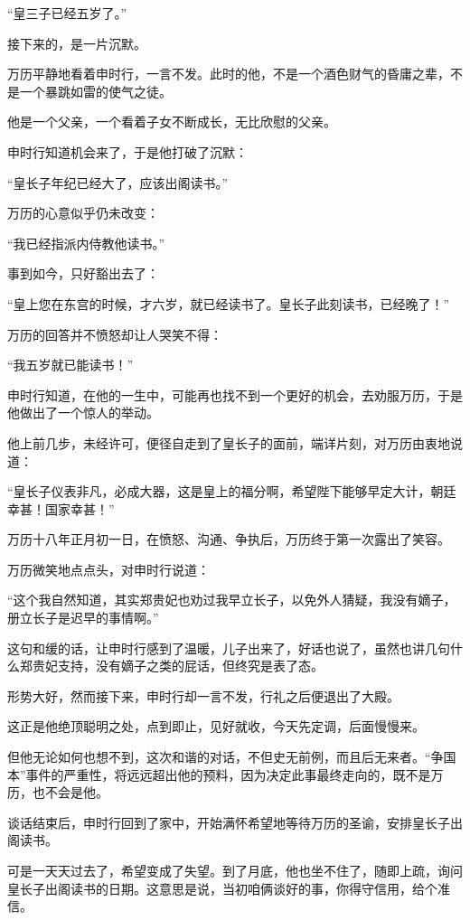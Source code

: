\begin{multicols}{\theparacolNo}
		“皇三子已经五岁了。”

		接下来的，是一片沉默。

		万历平静地看着申时行，一言不发。此时的他，不是一个酒色财气的昏庸之辈，不是一个暴跳如雷的使气之徒。

		他是一个父亲，一个看着子女不断成长，无比欣慰的父亲。

		申时行知道机会来了，于是他打破了沉默：

		“皇长子年纪已经大了，应该出阁读书。”

		万历的心意似乎仍未改变：

		“我已经指派内侍教他读书。”

		事到如今，只好豁出去了：

		“皇上您在东宫的时候，才六岁，就已经读书了。皇长子此刻读书，已经晚了！”

		万历的回答并不愤怒却让人哭笑不得：

		“我五岁就已能读书！”

		申时行知道，在他的一生中，可能再也找不到一个更好的机会，去劝服万历，于是他做出了一个惊人的举动。

		他上前几步，未经许可，便径自走到了皇长子的面前，端详片刻，对万历由衷地说道：

		“皇长子仪表非凡，必成大器，这是皇上的福分啊，希望陛下能够早定大计，朝廷幸甚！国家幸甚！”

		万历十八年正月初一日，在愤怒、沟通、争执后，万历终于第一次露出了笑容。

		万历微笑地点点头，对申时行说道：

		“这个我自然知道，其实郑贵妃也劝过我早立长子，以免外人猜疑，我没有嫡子，册立长子是迟早的事情啊。”

		这句和缓的话，让申时行感到了温暖，儿子出来了，好话也说了，虽然也讲几句什么郑贵妃支持，没有嫡子之类的屁话，但终究是表了态。

		形势大好，然而接下来，申时行却一言不发，行礼之后便退出了大殿。

		这正是他绝顶聪明之处，点到即止，见好就收，今天先定调，后面慢慢来。

		但他无论如何也想不到，这次和谐的对话，不但史无前例，而且后无来者。“争国本”事件的严重性，将远远超出他的预料，因为决定此事最终走向的，既不是万历，也不会是他。

		谈话结束后，申时行回到了家中，开始满怀希望地等待万历的圣谕，安排皇长子出阁读书。

		可是一天天过去了，希望变成了失望。到了月底，他也坐不住了，随即上疏，询问皇长子出阁读书的日期。这意思是说，当初咱俩谈好的事，你得守信用，给个准信。


\end{multicols}
